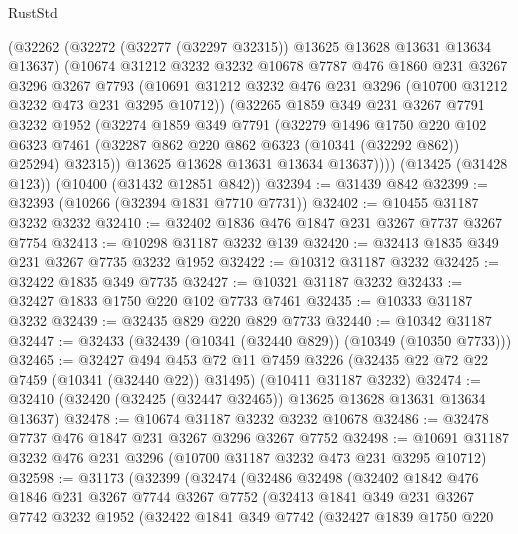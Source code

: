 \begin{lexlean}{RustStd}
\begin{coremodule}
{\begin{coremodule}
{{{{{{{{{{{{{{{{{{{{{{{{{      (@32262
        (@32272 (@32277 (@32297 @32315)) @13625 @13628 @13631 @13634 @13637)
        (@10674
          @31212
          @3232
          @3232
          @10678
          @7787
          @476
          @1860
          @231
          @3267
          @3296
          @3267
          @7793
          (@10691 @31212 @3232 @476 @231 @3296 (@10700 @31212 @3232 @473 @231 @3295 @10712))
          (@32265
            @1859
            @349
            @231
            @3267
            @7791
            @3232
            @1952
            (@32274
              @1859
              @349
              @7791
              (@32279
                @1496
                @1750
                @220
                @102
                @6323
                @7461
                (@32287 @862 @220 @862 @6323 (@10341 (@32292 @862)) @25294)
                @32315))
            @13625
            @13628
            @13631
            @13634
            @13637))))
    (@13425 (@31428 @123))
    (@10400 (@31432 @12851 @842))
@32394 := @31439 @842
@32399 := @32393 (@10266 (@32394 @1831 @7710 @7731))
@32402 := @10455 @31187 @3232 @3232
@32410 := @32402 @1836 @476 @1847 @231 @3267 @7737 @3267 @7754
@32413 := @10298 @31187 @3232 @139
@32420 := @32413 @1835 @349 @231 @3267 @7735 @3232 @1952
@32422 := @10312 @31187 @3232
@32425 := @32422 @1835 @349 @7735
@32427 := @10321 @31187 @3232
@32433 := @32427 @1833 @1750 @220 @102 @7733 @7461
@32435 := @10333 @31187 @3232
@32439 := @32435 @829 @220 @829 @7733
@32440 := @10342 @31187
@32447 := @32433 (@32439 (@10341 (@32440 @829)) (@10349 (@10350 @7733)))
@32465 := @32427
    @494
    @453
    @72
    @11
    @7459
    @3226
    (@32435 @22 @72 @22 @7459 (@10341 (@32440 @22)) @31495)
    (@10411 @31187 @3232)
@32474 := @32410 (@32420 (@32425 (@32447 @32465)) @13625 @13628 @13631 @13634 @13637)
@32478 := @10674 @31187 @3232 @3232 @10678
@32486 := @32478 @7737 @476 @1847 @231 @3267 @3296 @3267 @7752
@32498 := @10691 @31187 @3232 @476 @231 @3296 (@10700 @31187 @3232 @473 @231 @3295 @10712)
@32598 := @31173
    (@32399
      (@32474
        (@32486
          @32498
          (@32402
            @1842
            @476
            @1846
            @231
            @3267
            @7744
            @3267
            @7752
            (@32413
              @1841
              @349
              @231
              @3267
              @7742
              @3232
              @1952
              (@32422
                @1841
                @349
                @7742
                (@32427
                  @1839
                  @1750
                  @220
}}}}}}}}}}}}}}}}}}}}}}}}}
\end{coremodule}}
\end{coremodule}
\end{lexlean}
